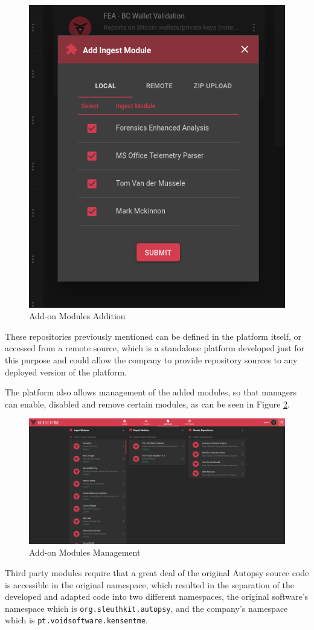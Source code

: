 \begin{figure}[ht]
 \centering
 \includegraphics[width=0.55\linewidth]{imgs/addmodule.png}
 \caption{Add-on Modules Addition}
 \label{fig:addmodule}
\end{figure}

These repositories previously mentioned can be defined in the platform itself, or accessed from a remote source, which is a standalone platform developed just for this purpose and could allow the company to provide repository sources to any deployed version of the platform.

The platform also allows management of the added modules, so that managers can enable, disabled and remove certain modules, as can be seen in Figure \ref{fig:modulesettings}.

\begin{figure}[ht]
 \centering
 \includegraphics[width=1\linewidth]{imgs/modulesettings.png}
 \caption{Add-on Modules Management}
 \label{fig:modulesettings}
\end{figure}

Third party modules require that a great deal of the original Autopsy source code is accessible in the original namespace, which resulted in the separation of the
developed and adapted code into two different namespaces, the original software's namespace which is \texttt{org.sleuthkit.autopsy}, and the company's namespace which is \texttt{pt.voidsoftware.kensentme}. 


